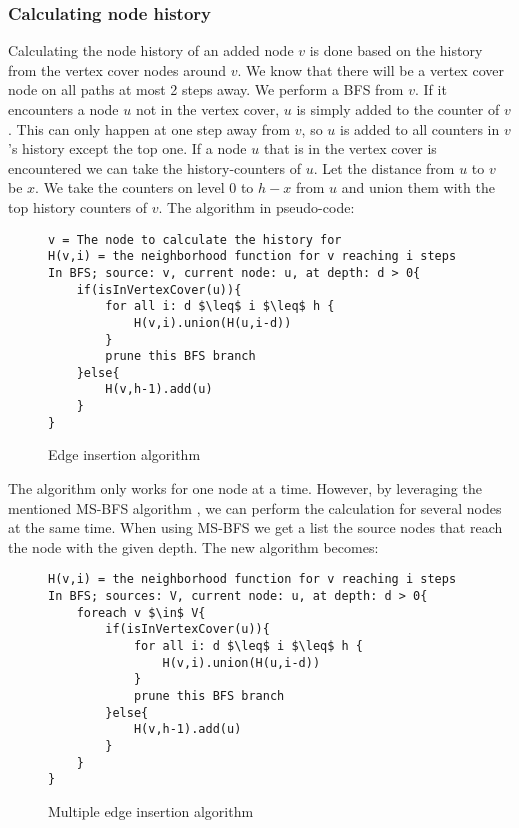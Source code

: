 \subsubsection{Calculating node history}

Calculating the node history of an added node $v$ is done based on the history from the vertex cover nodes around $v$. We know that there will be a vertex cover node on all paths at most 2 steps away. We perform a BFS from $v$. If it encounters a node $u$ not in the vertex cover, $u$ is simply added to the counter of $v$. This can only happen at one step away from $v$, so $u$ is added to all counters in $v$'s history except the top one. If a node $u$ that is in the vertex cover is encountered we can take the history-counters of $u$. Let the distance from $u$ to $v$ be $x$. We take the counters on level $0$ to $h-x$ from $u$ and union them with the top history counters of $v$.   The algorithm in pseudo-code:

\begin{figure}[h]
    \begin{lstlisting}[mathescape]
v = The node to calculate the history for
H(v,i) = the neighborhood function for v reaching i steps 
In BFS; source: v, current node: u, at depth: d > 0{
    if(isInVertexCover(u)){
        for all i: d $\leq$ i $\leq$ h {
            H(v,i).union(H(u,i-d))
        }
        prune this BFS branch
    }else{
        H(v,h-1).add(u)
    }
}
    \end{lstlisting}
    \caption{Edge insertion algorithm}
    \label{fig:edge_insertion_algorithm}
\end{figure}

The algorithm only works for one node at a time. However, by leveraging the mentioned MS-BFS algorithm \cite{msbfs}, we can perform the calculation for several nodes at the same time. When using MS-BFS we get a list the source nodes that reach the node with the given depth. The new algorithm becomes:

\begin{figure}[h]
    \begin{lstlisting}[mathescape]
H(v,i) = the neighborhood function for v reaching i steps
In BFS; sources: V, current node: u, at depth: d > 0{
    foreach v $\in$ V{
        if(isInVertexCover(u)){
            for all i: d $\leq$ i $\leq$ h {
                H(v,i).union(H(u,i-d))
            }
            prune this BFS branch
        }else{
            H(v,h-1).add(u)
        }
    }
}
    \end{lstlisting}
    \caption{Multiple edge insertion algorithm}
    \label{fig:multiple_edge_insertion_algorithm}
\end{figure}


